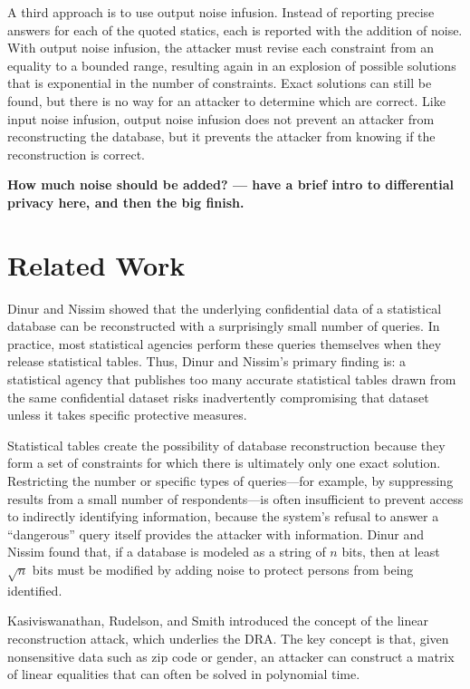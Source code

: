 \documentclass[runningheads]{llncs}
\newif\iflongversion
\begin{document}
A third approach is to use output noise infusion. Instead of reporting
precise answers for each of the quoted statics, each is reported with
the addition of noise.  With output noise infusion, the attacker must
revise each constraint from an equality to a bounded range, resulting
again in an explosion of possible solutions that is exponential in the
number of constraints. Exact solutions can still be found, but there
is no way for an attacker to determine which are correct.  Like input
noise infusion, output noise infusion does not prevent an attacker
from reconstructing the database, but it prevents the attacker from
knowing if the reconstruction is correct.

\textbf{How much noise should be added? --- have a brief intro to
  differential privacy here, and then the big finish.}

\section{Related Work}

Dinur and Nissim\cite{noise} showed that the underlying
confidential data of a statistical database can be reconstructed with
a surprisingly small number of queries. In practice, most statistical
agencies perform these queries themselves when they release
statistical tables. Thus, Dinur and Nissim's primary finding
is: a statistical agency that publishes too many accurate statistical
tables drawn from the same confidential dataset risks inadvertently
compromising that dataset unless it takes specific protective measures.

Statistical tables create the possibility of database reconstruction
because they form a set of constraints for which there is ultimately
only one exact solution. Restricting
the number or specific types of queries---for example, by suppressing
results from a small number of respondents---is often insufficient to prevent access
to indirectly identifying information, because the system's refusal to
answer a ``dangerous'' query itself provides the attacker with information. 
Dinur and Nissim found that, if a database is modeled as a string of $n$ bits,
then at least $\sqrt{n}$ bits must be modified by adding noise to
protect persons from being identified.

Kasiviswanathan, Rudelson, and Smith\cite{Kasiviswanathan:2013:PLR:2627817.2627919} introduced
the concept of the linear reconstruction attack, which underlies the  DRA. The key concept is that,
given nonsensitive data such as zip code or gender, an attacker
can construct a matrix of linear equalities that can often be solved
in polynomial time. \iflongversion The paper also analyzes a common reconstruction
technique known as least squares decoding, where the attacker sets up
a goal function to minimize the square of the distance between two
databases in order to reconstruct the original database.\fi
\end{document}
